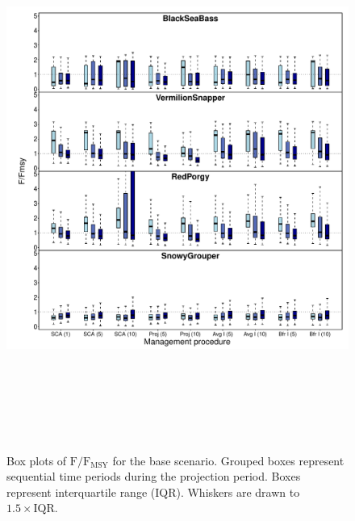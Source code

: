\documentclass[12pt,english]{article}
\begin{document}
\clearpage\begin{figure}[!ht]
\begin{center}
\includegraphics[width=6in, height=7in]{../Figs/boxplotFFMSY1.pdf}
\end{center}
\begin{flushleft}
\caption{Box plots of $\mathrm{F/F_{MSY}}$ for the base scenario. Grouped boxes represent sequential time periods during the projection period. Boxes represent interquartile range (IQR). Whiskers are drawn to $1.5\times\mathrm{IQR}$.}
\label{fig:boxplotFFMSY1}
\end{flushleft}
\end{figure}
\end{document}
